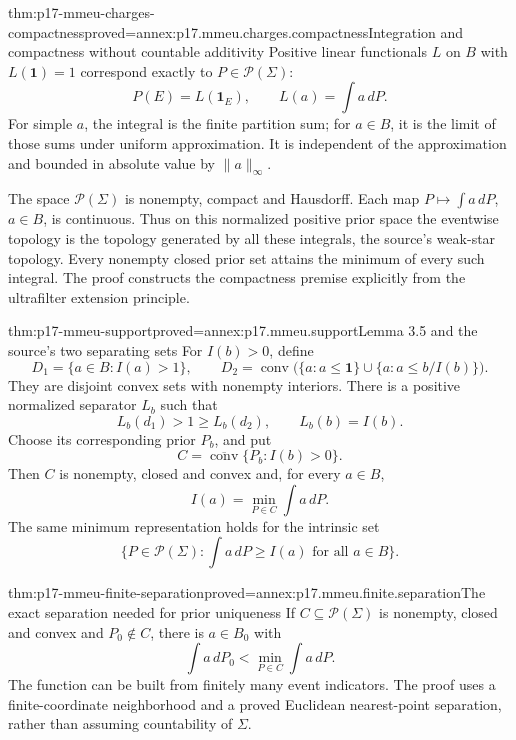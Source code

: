 \begin{hbtheorem}{thm:p17-mmeu-charges-compactness}{proved=annex:p17.mmeu.charges.compactness}{Integration and compactness without countable additivity}
Positive linear functionals \(L\) on \(B\) with
\(L(\mathbf1)=1\) correspond exactly to \(P\in\mathcal P(\Sigma)\):
\[
 P(E)=L(\mathbf1_E),\qquad
 L(a)=\int a\,dP .
\]
For simple \(a\), the integral is the finite partition sum;
for \(a\in B\), it is the limit of those sums under uniform
approximation. It is independent of the approximation and
bounded in absolute value by \(\|a\|_\infty\).

The space \(\mathcal P(\Sigma)\) is nonempty, compact and
Hausdorff. Each map \(P\mapsto\int a\,dP\), \(a\in B\),
is continuous. Thus on this normalized positive prior space
the eventwise topology is the topology generated by all
these integrals, the source's weak-star topology.
Every nonempty closed prior set attains the minimum of
every such integral. The proof constructs the compactness
premise explicitly from the ultrafilter extension principle.
\end{hbtheorem}

\begin{hbtheorem}{thm:p17-mmeu-support}{proved=annex:p17.mmeu.support}{Lemma 3.5 and the source's two separating sets}
For \(I(b)>0\), define
\[
 D_1=\{a\in B:I(a)>1\},\qquad
 D_2=\operatorname{conv}\bigl(\{a:a\leq\mathbf1\}
                          \cup\{a:a\leq b/I(b)\}\bigr).
\]
They are disjoint convex sets with nonempty interiors.
There is a positive normalized separator \(L_b\) such that
\[
               L_b(d_1)>1\geq L_b(d_2),\qquad L_b(b)=I(b).
\]
Choose its corresponding prior \(P_b\), and put
\[
       C=\overline{\operatorname{conv}}
                             \{P_b:I(b)>0\}.
\]
Then \(C\) is nonempty, closed and convex and, for every \(a\in B\),
\[
                              I(a)=\min_{P\in C}\int a\,dP .
\]
The same minimum representation holds for the intrinsic set
\[
              \{P\in\mathcal P(\Sigma):
                             \int a\,dP\geq I(a)\text{ for all }a\in B\}.
\]
\end{hbtheorem}

\begin{hblemma}{thm:p17-mmeu-finite-separation}{proved=annex:p17.mmeu.finite.separation}{The exact separation needed for prior uniqueness}
If \(C\subseteq\mathcal P(\Sigma)\) is nonempty, closed
and convex and \(P_0\notin C\), there is \(a\in B_0\) with
\[
                             \int a\,dP_0<\min_{P\in C}\int a\,dP .
\]
The function can be built from finitely many event indicators.
The proof uses a finite-coordinate neighborhood and a
proved Euclidean nearest-point separation, rather than
assuming countability of \(\Sigma\).
\end{hblemma}

